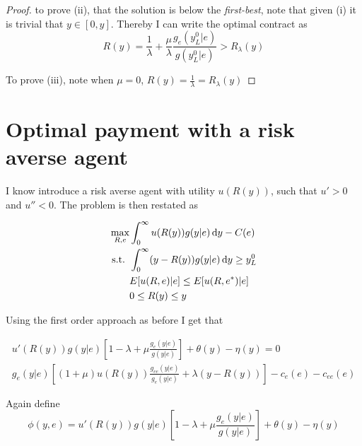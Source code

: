 \begin{proof}
to prove (ii), that the solution is below the \emph{first-best}, note that given (i) it is trivial that $y\in[0,y]$. Thereby I can write the optimal contract as 
\[
    R(y)=\frac{1}{\lambda}+\frac{\mu}{\lambda}\frac{g_e(y_L^0|e)}{g(y_L^0|e)}>R_\lambda(y)
\]

To prove (iii), note when $\mu=0$, $R(y)=\frac{1}{\lambda}=R_\lambda(y)$

\end{proof} 
\section{Optimal payment with a risk averse agent} %
\label{sec:optimal_payment_with_a_risk_averse_agent}
I know introduce a risk averse agent with utility $u(R(y))$, such that $u'>0$ and $u''<0$. The problem is then restated as 

\begin{subequations}
\label{eq:khun-tucker-ra}
\begin{align}
    \max_{R,e} & \int_0^{\infty}u(R(y))g(y|e)\dif y-C(e)\label{subeq:khun-tucker-ra1} \\
    \text{s.t. }    & \int_{0}^{\infty} (y-R(y))g(y|e)\dif y\geq y_L^0 \label{subeq:khun-tucker-ra2} \\
                    & E[u(R,e)|e]\leq E[u(R,e^*)|e] \label{subeq:khun-tucker-ra3}\\
                    & 0\leq R(y)\leq y \label{subeq:khun-tucker-ra4}
\end{align}
\end{subequations}

Using the first order approach as before I get that 

\begin{subequations}
\label{eq:lagrange-ra}
\begin{align}
    u'(R(y))g(y|e)\left[1-\lambda+\mu \frac{g_e(y|e)}{g(y|e)}\right] + \theta(y)-\eta(y)=0 \\
    g_e(y|e)\left[(1+\mu)u(R(y))\frac{g_{ee}(y|e)}{g_e(y|e)}+\lambda(y-R(y))\right]-c_e(e)-c_{ee}(e)
\end{align}
\end{subequations}

Again define 
\[
    \phi(y,e) = u'(R(y))g(y|e)\left[1-\lambda+\mu \frac{g_e(y|e)}{g(y|e)}\right]  + \theta(y)-\eta(y)
\]

